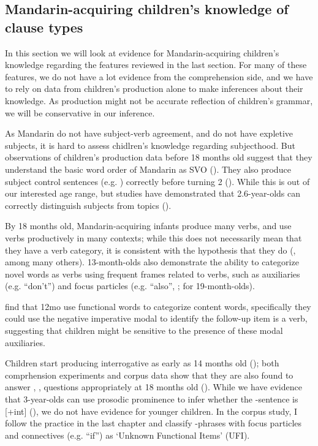 \subsection{Mandarin-acquiring children's knowledge of clause types}
\label{sec:mancl:bg:child}
In this section we will look at evidence for Mandarin-acquiring children's knowledge regarding the features reviewed in the last section. For many of these features, we do not have a lot evidence from the comprehension side, and we have to rely on data from children's production alone to make inferences about their knowledge. As production might not be accurate reflection of children's grammar, we will be conservative in our inference.   

   As Mandarin do not have subject-verb agreement, and do not have expletive subjects, it is hard to assess chidlren's knowledge regarding subjecthood. But observations of children's production data before 18 months old suggest that they understand the basic word order of Mandarin as SVO (\cite{tardif1993verb,tardif1996verb}). They also produce subject control sentences (e.g. ) correctly before turning 2 (\cite{yang2015control}). While this is out of our interested age range, but studies have demonstrated that 2.6-year-olds can correctly distinguish subjects from topics (\cite{chien1985subj}). 

 By 18 months old, Mandarin-acquiring infants produce many verbs, and use verbs productively in many contexts; while this does not necessarily mean that they have a verb category, it is consistent with the hypothesis that they do (\cite{tardif1993verb,tardif1996verb, xiaolee2006,zhangshili2015infant}, among many others). 13-month-olds also demonstrate the ability to categorize novel words as verbs using frequent frames related to verbs, such as auxiliaries (e.g.  ``don't'') and focus particles (e.g.  ``also'', \cite{zhangshili2015infant}; \cite{ying2021func} for 19-month-olds).

  \cite{zhangshili2015infant} find that 12mo use functional words to categorize content words, specifically they could use the negative imperative modal  to identify the follow-up item is a verb, suggesting that children might be sensitive to the presence of these modal auxiliaries.  %


 Children start producing interrogative \twh{} as early as 14 months old (\cite{lee1989acq, fan2012, linjing2014}); both comprhension experiments and corpus data show that they are also found to answer , ,  questions appropriately at 18 months old (\citealt{fan2012,moradlou2020}). While we have evidence that 3-year-olds can use prosodic prominence to infer whether the \twh-sentence is [+int] (\cite{WHanything}), we do not have evidence for younger children. In the corpus study, I follow the practice in the last chapter and classify \twh-phrases with focus particles and connectives (e.g.  ``if'') as `Unknown Functional Items' (UFI).

